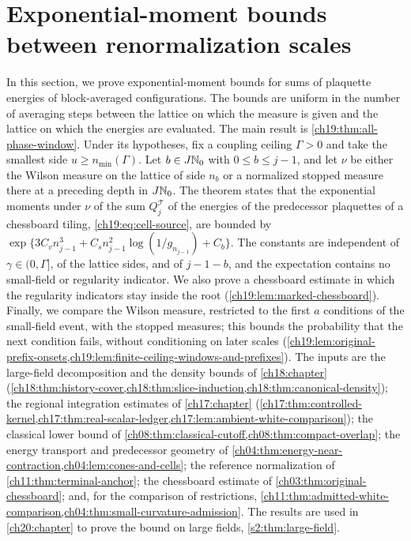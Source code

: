 \chapter{Exponential-moment bounds between renormalization scales}\label{ch19:chapter}

In this section, we prove exponential-moment bounds for sums of plaquette energies of block-averaged configurations. The bounds are uniform in the number of averaging steps between the lattice on which the measure is given and the lattice on which the energies are evaluated. The main result is \cref{ch19:thm:all-phase-window}. Under its hypotheses, fix a coupling ceiling $\Gamma>0$ and take the smallest side $u\ge n_{\min}(\Gamma)$. Let $b\in J\mathbb N_0$ with $0\le b\le j-1$, and let $\nu$ be either the Wilson measure on the lattice of side $n_b$ or a normalized stopped measure there at a preceding depth in $J\mathbb N_0$. The theorem states that the exponential moments under $\nu$ of the sum $Q_j^{\mathcal T}$ of the energies of the predecessor plaquettes of a chessboard tiling, \eqref{ch19:eq:cell-source}, are bounded by $\exp\{3C_vn_{j-1}^3+C_sn_{j-1}^2\log(1/g_{n_{j-1}})+C_b\}$. The constants are independent of $\gamma\in(0,\Gamma]$, of the lattice sides, and of $j-1-b$, and the expectation contains no small-field or regularity indicator. We also prove a chessboard estimate in which the regularity indicators stay inside the root (\cref{ch19:lem:marked-chessboard}). Finally, we compare the Wilson measure, restricted to the first $a$ conditions of the small-field event, with the stopped measures; this bounds the probability that the next condition fails, without conditioning on later scales (\cref{ch19:lem:original-prefix-onsets,ch19:lem:finite-ceiling-windows-and-prefixes}). The inputs are the large-field decomposition and the density bounds of \cref{ch18:chapter} (\cref{ch18:thm:history-cover,ch18:thm:slice-induction,ch18:thm:canonical-density}); the regional integration estimates of \cref{ch17:chapter} (\cref{ch17:thm:controlled-kernel,ch17:thm:real-scalar-ledger,ch17:lem:ambient-white-comparison}); the classical lower bound of \cref{ch08:thm:classical-cutoff,ch08:thm:compact-overlap}; the energy transport and predecessor geometry of \cref{ch04:thm:energy-near-contraction,ch04:lem:cones-and-cells}; the reference normalization of \cref{ch11:thm:terminal-anchor}; the chessboard estimate of \cref{ch03:thm:original-chessboard}; and, for the comparison of restrictions, \cref{ch11:thm:admitted-white-comparison,ch04:thm:small-curvature-admission}. The results are used in \cref{ch20:chapter} to prove the bound on large fields, \cref{s2:thm:large-field}.

